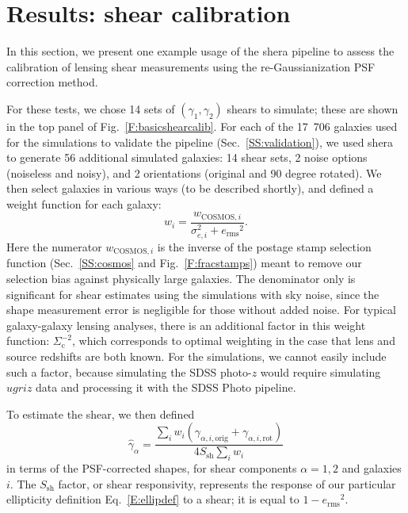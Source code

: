 \documentclass[twocolumn,useAMS,usenatbib]{mn2e}
\newcommand{\beq}{\begin{equation}}
\newcommand{\eeq}{\end{equation}}
\newcommand{\erms}{\ensuremath{e_\mathrm{rms}}}
\newcommand{\newtext}{}
\begin{document}
\section{Results: shear calibration}\label{S:results}

\newtext{In this section, we present one example usage of the {\sc
    shera} pipeline to assess the calibration of lensing shear
  measurements using the re-Gaussianization PSF correction method.
}

For these tests, we chose 14 sets of $(\gamma_1, \gamma_2)$ 
shears to simulate; these are shown in the top
panel of Fig.~\ref{F:basicshearcalib}.  For each of the 17~706 galaxies used for
the simulations to validate the pipeline
(Sec.~\ref{SS:validation}), we used {\sc shera} to generate 56 additional
simulated galaxies: 14 shear sets, 2 noise options (noiseless and
noisy), and 2 orientations (original and 90 degree rotated).  We then
select galaxies in various ways (to be described shortly), and defined
a weight function for each galaxy:
\beq\label{E:weightfunc}
w_i = \frac{w_{\mathrm{COSMOS},i}}{\sigma_{e,i}^2 + \erms^2}.
\eeq
Here the numerator $w_{\mathrm{COSMOS},i}$ is the inverse of the
postage stamp selection function (Sec.~\ref{SS:cosmos} and
Fig.~\ref{F:fracstamps}) meant to remove our selection bias against
physically large galaxies.  \newtext{The denominator only is
  significant for shear estimates using the simulations with sky
  noise, since the shape measurement error is negligible for those
  without added noise.}  For typical galaxy-galaxy lensing analyses,
there is an additional factor in this weight function:
$\Sigma_\mathrm{c}^{-2}$, which corresponds to optimal weighting in
the case that lens and source redshifts are both known.  For the
simulations, we cannot easily include such a factor, because
simulating the SDSS photo-$z$ would require simulating $ugriz$ data and
processing it with the SDSS {\sc Photo} pipeline.

To estimate the shear, we then defined
\beq\label{E:shearest}
\hat{\gamma}_\alpha = \frac{\sum_i w_i (\gamma_{\alpha,
    i,\mathrm{orig}} + \gamma_{\alpha, i, \mathrm{rot}})}{4 S_\mathrm{sh} \sum_i w_i}
\eeq 
in terms of the PSF-corrected shapes, for shear components $\alpha =
1, 2$ and galaxies $i$.  The $S_\mathrm{sh}$ factor, or shear
responsivity, represents the response of our particular ellipticity
definition Eq.~\eqref{E:ellipdef} to a shear; it is equal to
$1-\erms^2$.%
\end{document}
